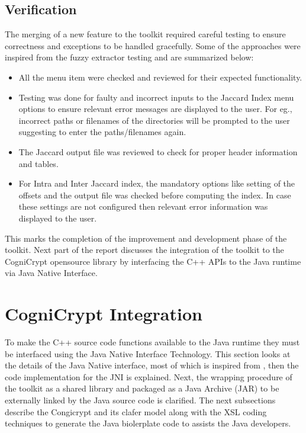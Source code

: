 \subsection{Verification}
The merging of a new feature to the toolkit required careful testing to ensure correctness and exceptions to be handled gracefully. Some of the approaches were inspired from the fuzzy extractor testing and are summarized below:
\begin{itemize}
	\item All the menu item were checked and reviewed for their expected functionality.
	\item Testing was done for faulty and incorrect inputs to the Jaccard Index menu options to ensure relevant error messages are displayed to the user. For eg., incorrect paths or filenames of the directories will be prompted to the user suggesting to enter the paths/filenames again.
	\item The Jaccard output file was reviewed to check for proper header information and tables.
	\item For Intra and Inter Jaccard index, the mandatory options like setting of the offsets and the output file was checked before computing the index. In case these settings are not configured then relevant error information was displayed to the user.
\end{itemize}

This marks the completion of the improvement and development phase of the toolkit. Next part of the report discusses the integration of the toolkit to the CogniCrypt opensource library by interfacing the C++ APIs to the Java runtime via Java Native Interface.

\section{CogniCrypt Integration}

To make the C++ source code functions available to the Java runtime they must be interfaced using the Java Native Interface Technology. This section looks at the details of the Java Native interface, most of which is inspired from \cite{jni}, then the code implementation for the JNI is explained. Next, the wrapping procedure of the toolkit as a shared library and packaged as a Java Archive (JAR) to be externally linked by the Java source code is clarified. The next subsections describe the Congicrypt and its clafer model
along with the XSL coding techniques to generate the Java biolerplate code to assists the Java developers.\\

